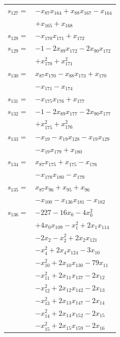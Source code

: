 \begin{longtable}{@{}r@{\;}l@{}}
\(s_{127}=\) & \(\displaystyle -x_{87}x_{164} +x_{88}x_{167} -x_{164}\) \\
 & \(\displaystyle +x_{165} +x_{168}\) \\[3pt]
\(s_{128}=\) & \(\displaystyle -x_{170}x_{171} +x_{172}\) \\[3pt]
\(s_{129}=\) & \(\displaystyle -1 -2x_{89}x_{172} -2x_{90}x_{172}\) \\
 & \(\displaystyle +x_{170}^{2} +x_{171}^{2}\) \\[3pt]
\(s_{130}=\) & \(\displaystyle x_{87}x_{170} -x_{88}x_{173} +x_{170}\) \\
 & \(\displaystyle -x_{171} -x_{174}\) \\[3pt]
\(s_{131}=\) & \(\displaystyle -x_{175}x_{176} +x_{177}\) \\[3pt]
\(s_{132}=\) & \(\displaystyle -1 -2x_{89}x_{177} -2x_{90}x_{177}\) \\
 & \(\displaystyle +x_{175}^{2} +x_{176}^{2}\) \\[3pt]
\(s_{133}=\) & \(\displaystyle -x_{19} -x_{19}x_{128} -x_{19}x_{129}\) \\
 & \(\displaystyle -x_{19}x_{179} +x_{180}\) \\[3pt]
\(s_{134}=\) & \(\displaystyle x_{87}x_{175} +x_{175} -x_{176}\) \\
 & \(\displaystyle -x_{178}x_{180} -x_{179}\) \\[3pt]
\(s_{135}=\) & \(\displaystyle x_{87}x_{96} +x_{95} +x_{96}\) \\
 & \(\displaystyle -x_{100} -x_{136}x_{181} -x_{182}\) \\[3pt]
\(s_{136}=\) & \(\displaystyle -227 -16x_{0} -4x_{0}^{2}\) \\
 & \(\displaystyle +4x_{0}x_{109} -x_{1}^{2} +2x_{1}x_{114}\) \\
 & \(\displaystyle -2x_{2} -x_{2}^{2} +2x_{2}x_{121}\) \\
 & \(\displaystyle -x_{4}^{2} +2x_{4}x_{124} -3x_{10}\) \\
 & \(\displaystyle -x_{10}^{2} +2x_{10}x_{130} -79x_{11}\) \\
 & \(\displaystyle -x_{11}^{2} +2x_{11}x_{137} -2x_{12}\) \\
 & \(\displaystyle -x_{12}^{2} +2x_{12}x_{142} -2x_{13}\) \\
 & \(\displaystyle -x_{13}^{2} +2x_{13}x_{147} -2x_{14}\) \\
 & \(\displaystyle -x_{14}^{2} +2x_{14}x_{152} -2x_{15}\) \\
 & \(\displaystyle -x_{15}^{2} +2x_{15}x_{159} -2x_{16}\) \\

\end{longtable}
